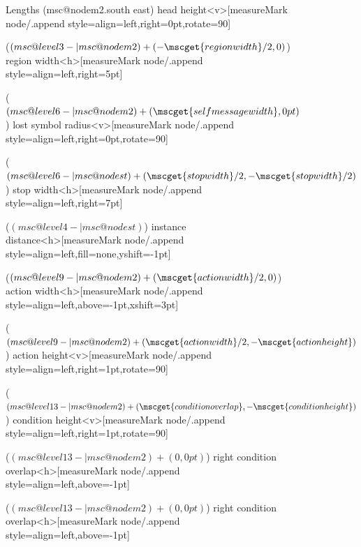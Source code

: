 \documentclass[12pt,a4paper]{article}
\begin{document}
\begin{figure}[htb]
\begin{msc}[right environment distance=2.3cm]{Lengths}
    {(msc@nodem2.south east)}%
    {head height}<v>[measureMark node/.append style={align=left,right=0pt,rotate=90}]
  
    {($(msc@level3-|msc@nodem2)+(-\mscget{region width}/2,0)$)}%
    {region width}<h>[measureMark node/.append style={align=left,right=5pt}]
  
    {($(msc@level6-|msc@nodem2)+(\mscget{self message width},0pt)$)}%
    {lost symbol radius}<v>[measureMark node/.append style={align=left,right=0pt,rotate=90}]
  
    {($(msc@level6-|msc@nodest)+(\mscget{stop width}/2,-\mscget{stop width}/2)$)}%
    {stop width}<h>[measureMark node/.append style={align=left,right=7pt}]
  
    {($(msc@level4-|msc@nodest)$)}%
    {instance\\ distance}<h>[measureMark node/.append style={align=left,fill=none,yshift=-1pt}]
  
    {($(msc@level9-|msc@nodem2)+(\mscget{action width}/2,0)$)}%
    {action width}<h>[measureMark node/.append style={align=left,above=-1pt,xshift=3pt}]
  
    {($(msc@level9-|msc@nodem2)+(\mscget{action width}/2,-\mscget{action height})$)}%
    {action height}<v>[measureMark node/.append style={align=left,right=1pt,rotate=90}]
  
    {($(msc@level13-|msc@nodem2)+(\mscget{condition overlap},-\mscget{condition height})$)}%
    {condition height}<v>[measureMark node/.append style={align=left,right=1pt,rotate=90}]
  
    {($(msc@level13-|msc@nodem2)+(0,0pt)$)}%
    {right condition overlap}<h>[measureMark node/.append style={align=left,above=-1pt}]
  
    {($(msc@level13-|msc@nodem2)+(0,0pt)$)}%
    {right condition overlap}<h>[measureMark node/.append style={align=left,above=-1pt}]
  

\end{msc}
\end{figure}
\end{document}
